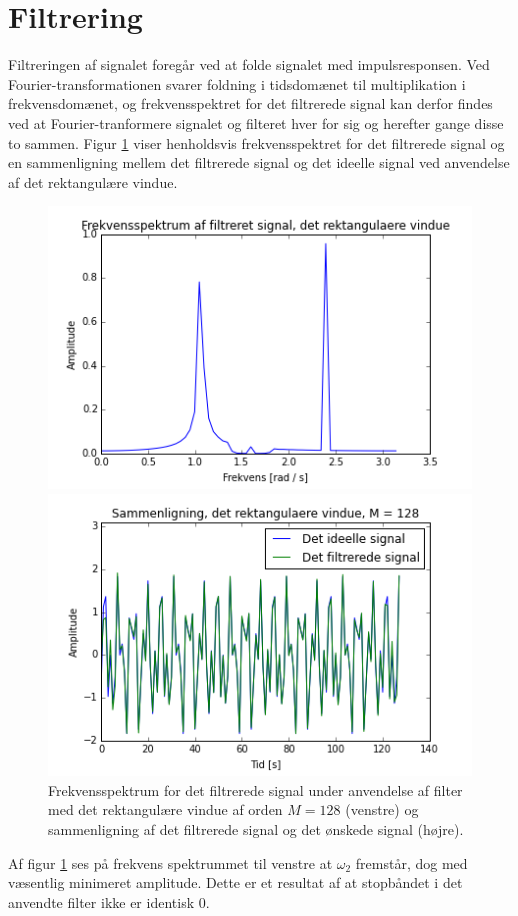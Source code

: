 \section{Filtrering}\label{sec_filtering}
Filtreringen af signalet foregår ved at folde signalet med impulsresponsen. Ved Fourier-transformationen svarer foldning i tidsdomænet til multiplikation i frekvensdomænet, og frekvensspektret for det filtrerede signal kan derfor findes ved at Fourier-tranformere signalet og filteret hver for sig og herefter gange disse to sammen. Figur \ref{fig:resultat_rekt} viser henholdsvis frekvensspektret for det filtrerede signal og en sammenligning mellem det filtrerede signal og det ideelle signal ved anvendelse af det rektangulære vindue.

\begin{figure}[H]
\begin{minipage}{0.49\textwidth}
\centering
\includegraphics[width=\textwidth]{figures/Filter/freq_filt_signal_rekt.png}
\end{minipage}
\begin{minipage}{0.49\textwidth}
\centering
\includegraphics[width=\textwidth]{figures/Filter/signal_compare_rekt.png}
\end{minipage}
\caption{Frekvensspektrum for det filtrerede signal under anvendelse af filter med det rektangulære vindue af orden $M=128$ (venstre) og sammenligning af det filtrerede signal og det ønskede signal (højre).}
\label{fig:resultat_rekt}
\end{figure}
Af figur \ref{fig:resultat_rekt} ses på frekvens spektrummet til venstre at $\omega_2$ fremstår, dog med væsentlig minimeret amplitude. Dette er et resultat af at stopbåndet i det anvendte filter ikke er identisk 0.      